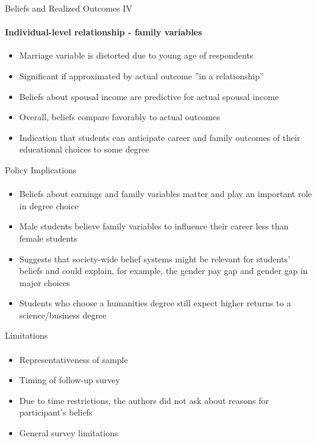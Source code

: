 \documentclass[12pt]{beamer}
\begin{document}
\begin{frame}{Beliefs and Realized Outcomes IV}
    \framesubtitle{Individual-level relationship - family variables}
    \begin{itemize}
        \item Marriage variable is distorted due to young age of respondents
        \item Significant if approximated by actual outcome ”in a relationship”
        \item Beliefs about spousal income are predictive for actual spousal income
        \vspace{0.5cm}
        \item Overall, beliefs compare favorably to actual outcomes
        \item Indication that students can anticipate career and family outcomes of their educational choices to some degree
    \end{itemize}
\end{frame}

\begin{frame}{Policy Implications}
    \framesubtitle{} 
    \begin{itemize}
        \item Beliefs about earnings and family variables matter and play an important role in degree choice 
        \item Male students believe family variables to influence their career less than female students  
        \item Suggests that society-wide belief systems might be relevant for students' beliefs and could explain, for example, the gender pay gap and gender gap in major choices 
        \item Students who choose a humanities degree still expect higher returns to a science/business degree
    \end{itemize}
\end{frame}

\begin{frame}{Limitations}
    \framesubtitle{} 
    \begin{itemize}
        \item Representativeness of sample
        \item Timing of follow-up survey
        \item Due to time restrictions, the authors did not ask about reasons for participant's beliefs
        \item General survey limitations
    \end{itemize}
\end{frame}
\end{document}
